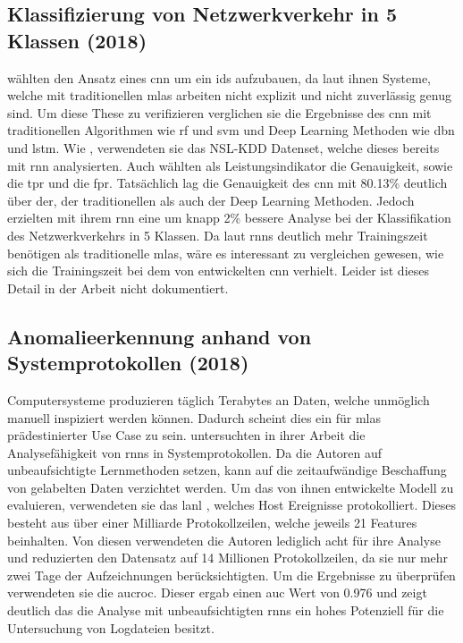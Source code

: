 \documentclass[
    12pt, %
    DIV10,
    ngerman, %
    a4paper, %
    oneside, %
    titlepage, %
    parskip=half, %
    headings=normal, %
    listof=totoc, %
    bibliography=totoc, %
    index=totoc, %
    captions=tableheading, %
    final %
]{scrreprt}
\begin{document}
\subsection{Klassifizierung von Netzwerkverkehr in 5 Klassen (2018)}\label{ding}
\textcite{Ding2018} wählten den Ansatz eines \ac{cnn} um ein \ac{ids} aufzubauen, da laut ihnen Systeme, welche mit traditionellen \ac{mlas} arbeiten nicht explizit und nicht zuverlässig genug sind. Um diese These zu verifizieren verglichen sie die Ergebnisse des \ac{cnn} mit traditionellen Algorithmen wie \ac{rf} und \ac{svm} und Deep Learning Methoden wie \ac{dbn} und \ac{lstm}. Wie \textcite{Yin2017}, verwendeten sie das NSL-KDD Datenset, welche dieses bereits mit \ac{rnn} analysierten. Auch \textcite{Ding2018} wählten als Leistungsindikator die Genauigkeit, sowie die \ac{tpr} und die \ac{fpr}. Tatsächlich lag die Genauigkeit des \ac{cnn} mit 80.13\% deutlich über der, der traditionellen als auch der Deep Learning Methoden. Jedoch erzielten \textcite{Yin2017} mit ihrem \ac{rnn} eine um knapp 2\% bessere Analyse bei der Klassifikation des Netzwerkverkehrs in 5 Klassen. Da laut \textcite{Yin2017} \ac{rnns} deutlich mehr Trainingszeit benötigen als traditionelle \ac{mlas}, wäre es interessant zu vergleichen gewesen, wie sich die Trainingszeit bei dem von \textcite{Ding2018} entwickelten \ac{cnn} verhielt. Leider ist dieses Detail in der Arbeit nicht dokumentiert.
%
\subsection{Anomalieerkennung anhand von Systemprotokollen (2018)}\label{brown}
Computersysteme produzieren täglich Terabytes an Daten, welche unmöglich manuell inspiziert werden können. Dadurch scheint dies ein für \ac{mlas} prädestinierter Use Case zu sein. \textcite{Brown2018} untersuchten in ihrer Arbeit die Analysefähigkeit von \ac{rnns} in Systemprotokollen. Da die Autoren auf unbeaufsichtigte Lernmethoden setzen, kann auf die zeitaufwändige Beschaffung von gelabelten Daten verzichtet werden. Um das von ihnen entwickelte Modell zu evaluieren, verwendeten sie das \ac{lanl} \parencite{akent-2015-enterprise-data}, welches Host Ereignisse protokolliert. Dieses besteht aus über einer Milliarde Protokollzeilen, welche jeweils 21 Features beinhalten. Von diesen verwendeten die Autoren lediglich acht für ihre Analyse und reduzierten den Datensatz auf 14 Millionen Protokollzeilen, da sie nur mehr zwei Tage der Aufzeichnungen berücksichtigten. Um die Ergebnisse zu überprüfen verwendeten sie die \ac{aucroc}. Dieser ergab einen \ac{auc} Wert von 0.976 und zeigt deutlich das die Analyse mit unbeaufsichtigten \ac{rnns} ein hohes Potenziell für die Untersuchung von Logdateien besitzt.
%
\end{document}
